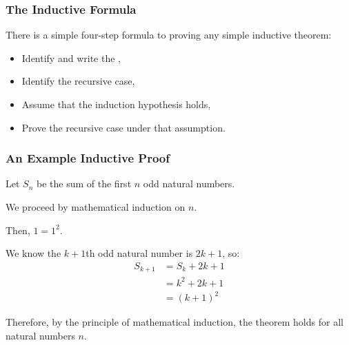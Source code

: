 \documentclass[aspectratio=169]{beamer}
\begin{document}
\begin{frame}[fragile]
  \frametitle{The Inductive Formula}

  There is a simple four-step formula to proving any simple inductive theorem: 

  \vspace{5pt}

  \begin{itemize}
    \item Identify and write the ,
    \item Identify the recursive case, 
    \item Assume that the induction hypothesis holds, 
    \item Prove the recursive case under that assumption. 
  \end{itemize}

  \vspace{\fill}

\end{frame}

\begin{frame}[fragile]
  \frametitle{An Example Inductive Proof}
 
  { \small
  Let $S_n$ be the sum of the first $n$ odd natural numbers.

  \vspace{\fill}


  \vspace{\fill}

  We proceed by mathematical induction on $n$. 

  \vspace{\fill}
  
  Then, $1 = 1^2$.

  \vspace{\fill}



  \vspace{\fill}

  We know the $k + 1$th odd natural number is $2k + 1$, so: 
  \begin{align*} 
    S_{k + 1} &= S_k + 2k + 1 \\
              &= k^2 + 2k + 1 \\
              &= (k + 1)^2 
  \end{align*}

  Therefore, by the principle of mathematical induction, the theorem holds 
  for all natural numbers $n$.
  }
\end{frame}
\end{document}
